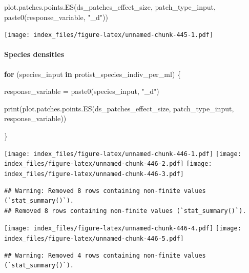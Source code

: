 \documentclass[
]{article}
\newenvironment{Shaded}{\begin{snugshade}}{\end{snugshade}}
\newcommand{\ControlFlowTok}[1]{\textcolor[rgb]{0.13,0.29,0.53}{\textbf{#1}}}
\newcommand{\FunctionTok}[1]{\textcolor[rgb]{0.00,0.00,0.00}{#1}}
\newcommand{\NormalTok}[1]{#1}
\newcommand{\OtherTok}[1]{\textcolor[rgb]{0.56,0.35,0.01}{#1}}
\newcommand{\StringTok}[1]{\textcolor[rgb]{0.31,0.60,0.02}{#1}}
\begin{document}
\begin{Shaded}
\begin{Highlighting}[]
\FunctionTok{plot.patches.points.ES}\NormalTok{(ds\_patches\_effect\_size, }
\NormalTok{                       patch\_type\_input,}
                       \FunctionTok{paste0}\NormalTok{(response\_variable, }\StringTok{"\_d"}\NormalTok{))}
\end{Highlighting}
\end{Shaded}

\texttt{[image: index\_files/figure-latex/unnamed-chunk-445-1.pdf]}

\hypertarget{species-densities-3}{%
\paragraph{Species densities}\label{species-densities-3}}

\begin{Shaded}
\begin{Highlighting}[]
\ControlFlowTok{for}\NormalTok{ (species\_input }\ControlFlowTok{in}\NormalTok{ protist\_species\_indiv\_per\_ml) \{}
  
\NormalTok{  response\_variable }\OtherTok{=} \FunctionTok{paste0}\NormalTok{(species\_input, }\StringTok{"\_d"}\NormalTok{)}
  
  \FunctionTok{print}\NormalTok{(}\FunctionTok{plot.patches.points.ES}\NormalTok{(ds\_patches\_effect\_size, patch\_type\_input,}
\NormalTok{                               response\_variable))}
        
\NormalTok{\}}
\end{Highlighting}
\end{Shaded}

\texttt{[image: index\_files/figure-latex/unnamed-chunk-446-1.pdf]}
\texttt{[image: index\_files/figure-latex/unnamed-chunk-446-2.pdf]}
\texttt{[image: index\_files/figure-latex/unnamed-chunk-446-3.pdf]}

\begin{verbatim}
## Warning: Removed 8 rows containing non-finite values (`stat_summary()`).
## Removed 8 rows containing non-finite values (`stat_summary()`).
\end{verbatim}

\texttt{[image: index\_files/figure-latex/unnamed-chunk-446-4.pdf]}
\texttt{[image: index\_files/figure-latex/unnamed-chunk-446-5.pdf]}

\begin{verbatim}
## Warning: Removed 4 rows containing non-finite values (`stat_summary()`).
\end{verbatim}
\end{document}
